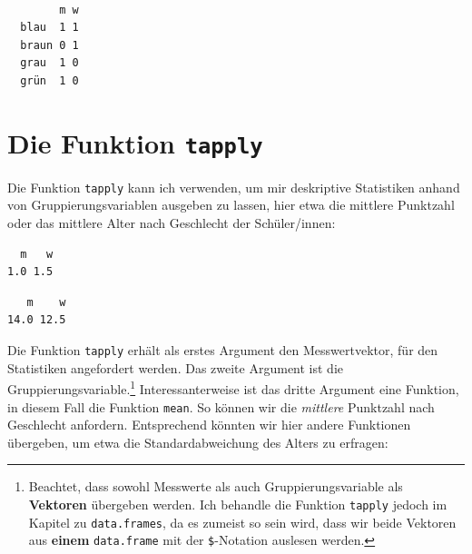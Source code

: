 \documentclass[12pt,]{tufte-book}
\newenvironment{Shaded}{\begin{snugshade}}{\end{snugshade}}
\newcommand{\KeywordTok}[1]{\textcolor[rgb]{0.13,0.29,0.53}{\textbf{#1}}}
\newcommand{\OperatorTok}[1]{\textcolor[rgb]{0.81,0.36,0.00}{\textbf{#1}}}
\newcommand{\NormalTok}[1]{#1}
\theoremstyle{definition}
\theoremstyle{definition}
\theoremstyle{definition}
\theoremstyle{remark}
\begin{document}
\begin{Shaded}
\end{Shaded}

\begin{verbatim}
       
        m w
  blau  1 1
  braun 0 1
  grau  1 0
  grün  1 0
\end{verbatim}

\hypertarget{tapply}{\section{\texorpdfstring{Die Funktion
\texttt{tapply}}{Die Funktion tapply}}\label{tapply}}

Die Funktion \texttt{tapply} kann ich verwenden, um mir deskriptive
Statistiken anhand von Gruppierungsvariablen ausgeben zu lassen, hier
etwa die mittlere Punktzahl oder das mittlere Alter nach Geschlecht der
Schüler/innen:

\begin{Shaded}
\end{Shaded}

\begin{verbatim}
  m   w 
1.0 1.5 
\end{verbatim}

\begin{Shaded}
\end{Shaded}

\begin{verbatim}
   m    w 
14.0 12.5 
\end{verbatim}

Die Funktion \texttt{tapply} erhält als erstes Argument den
Messwertvektor, für den Statistiken angefordert werden. Das zweite
Argument ist die Gruppierungsvariable.\footnote{Beachtet, dass sowohl
  Messwerte als auch Gruppierungsvariable als \textbf{Vektoren}
  übergeben werden. Ich behandle die Funktion \texttt{tapply} jedoch im
  Kapitel zu \texttt{data.frames}, da es zumeist so sein wird, dass wir
  beide Vektoren aus \textbf{einem} \texttt{data.frame} mit der
  \texttt{\$}-Notation auslesen werden.} Interessanterweise ist das
dritte Argument eine Funktion, in diesem Fall die Funktion
\texttt{mean}. So können wir die \emph{mittlere} Punktzahl nach
Geschlecht anfordern. Entsprechend könnten wir hier andere Funktionen
übergeben, um etwa die Standardabweichung des Alters zu erfragen:
\end{document}
